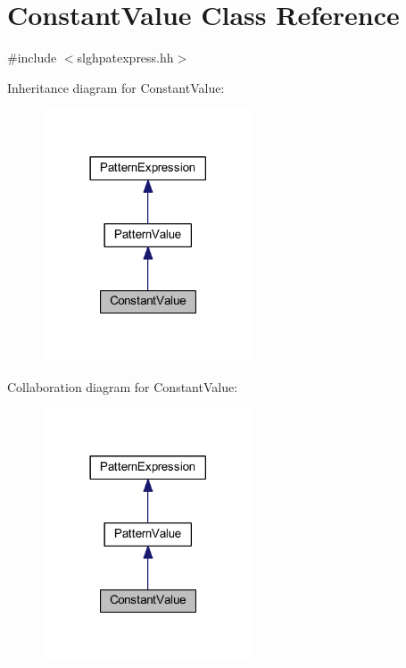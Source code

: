 \hypertarget{class_constant_value}{}\section{Constant\+Value Class Reference}
\label{class_constant_value}


{\ttfamily \#include $<$slghpatexpress.\+hh$>$}



Inheritance diagram for Constant\+Value\+:
\nopagebreak
\begin{figure}[H]
\begin{center}
\leavevmode
\includegraphics[width=177pt]{class_constant_value__inherit__graph}
\end{center}
\end{figure}


Collaboration diagram for Constant\+Value\+:
\nopagebreak
\begin{figure}[H]
\begin{center}
\leavevmode
\includegraphics[width=177pt]{class_constant_value__coll__graph}
\end{center}
\end{figure}
